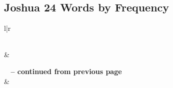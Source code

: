 

\subsection{Joshua 24 Words by Frequency}


\normalsize
 
\begin{center}
\begin{longtable}{l|r}
\caption[Joshua 24 Words by Frequency]{Joshua 24 Words by Frequency}\label{table:WordsbyFrequency for Joshua 24} \\
\hline {} &  \\ \hline 
\endfirsthead
 
{{\bfseries \tablename\ \thetable{} -- continued from previous page}} \\  
\hline {} &  \\ \hline 
\endhead
 

\end{longtable}
\end{center}
